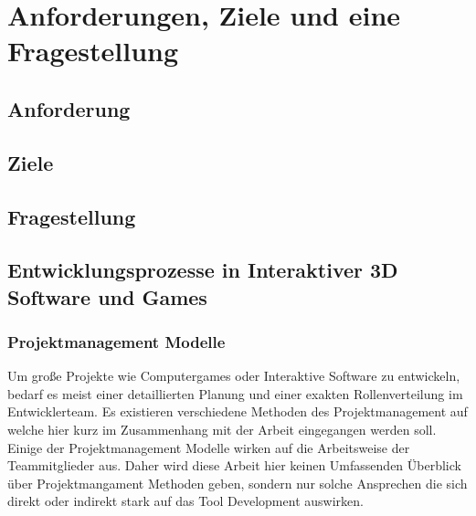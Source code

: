 \documentclass[pagesize, paper=a4, fontsize=12pt,titlepage=true, headings=small, headnosepline, abstractoff, liststotoc, nochapterprefix, plainheadsepline, twoside]{scrreprt}
\begin{document}
\begingroup
	\clearpage
	\pagestyle{empty}
	\tableofcontents
	\clearpage
\endgroup
\newpage
\thispagestyle{empty}
\mbox{}


\renewcommand*{\chapterpagestyle}{plain}
\pagestyle{plain}
\setcounter{page}{0}

\chapter{Anforderungen, Ziele und eine Fragestellung}

\section{Anforderung}
\section{Ziele}
\section{Fragestellung}

\section{Entwicklungsprozesse in Interaktiver 3D Software und Games}
\subsection{Projektmanagement Modelle}
Um große Projekte wie Computergames oder Interaktive Software zu entwickeln, bedarf es meist einer detaillierten Planung und einer exakten Rollenverteilung im Entwicklerteam. Es existieren verschiedene Methoden des Projektmanagement auf welche hier kurz im Zusammenhang mit der Arbeit eingegangen werden soll. Einige der Projektmanagement Modelle wirken auf die Arbeitsweise der Teammitglieder aus. Daher wird diese Arbeit hier keinen Umfassenden Überblick über Projektmangament Methoden geben, sondern nur solche Ansprechen die sich direkt oder indirekt stark auf das Tool Development auswirken.
\end{document}

